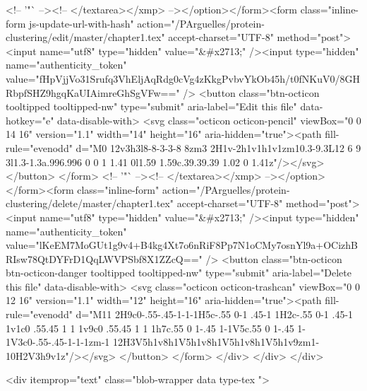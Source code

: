             <!-- '"` --><!-- </textarea></xmp> --></option></form><form class="inline-form js-update-url-with-hash" action="/PArguelles/protein-clustering/edit/master/chapter1.tex" accept-charset="UTF-8" method="post"><input name="utf8" type="hidden" value="&#x2713;" /><input type="hidden" name="authenticity_token" value="fHpVjjVo31Srufq3VhEljAqRdg0cVg4zKkgPvbvYkOb45h/t0fNKuV0/8GHRbpfSHZ9hgqKaUIAimreGhSgVFw==" />
              <button class="btn-octicon tooltipped tooltipped-nw" type="submit"
                aria-label="Edit this file" data-hotkey="e" data-disable-with>
                <svg class="octicon octicon-pencil" viewBox="0 0 14 16" version="1.1" width="14" height="16" aria-hidden="true"><path fill-rule="evenodd" d="M0 12v3h3l8-8-3-3-8 8zm3 2H1v-2h1v1h1v1zm10.3-9.3L12 6 9 3l1.3-1.3a.996.996 0 0 1 1.41 0l1.59 1.59c.39.39.39 1.02 0 1.41z"/></svg>
              </button>
</form>
          <!-- '"` --><!-- </textarea></xmp> --></option></form><form class="inline-form" action="/PArguelles/protein-clustering/delete/master/chapter1.tex" accept-charset="UTF-8" method="post"><input name="utf8" type="hidden" value="&#x2713;" /><input type="hidden" name="authenticity_token" value="lKeEM7MoGUt1g9v4+B4kg4Xt7o6nRiF8Pp7N1oCMy7osnYl9a+OCizhBRIsw78QtDYFrD1QqLWVPSbf8X1ZZcQ==" />
            <button class="btn-octicon btn-octicon-danger tooltipped tooltipped-nw" type="submit"
              aria-label="Delete this file" data-disable-with>
              <svg class="octicon octicon-trashcan" viewBox="0 0 12 16" version="1.1" width="12" height="16" aria-hidden="true"><path fill-rule="evenodd" d="M11 2H9c0-.55-.45-1-1-1H5c-.55 0-1 .45-1 1H2c-.55 0-1 .45-1 1v1c0 .55.45 1 1 1v9c0 .55.45 1 1 1h7c.55 0 1-.45 1-1V5c.55 0 1-.45 1-1V3c0-.55-.45-1-1-1zm-1 12H3V5h1v8h1V5h1v8h1V5h1v8h1V5h1v9zm1-10H2V3h9v1z"/></svg>
            </button>
</form>    </div>
  </div>
</div>

      

  <div itemprop="text" class="blob-wrapper data type-tex ">
      
